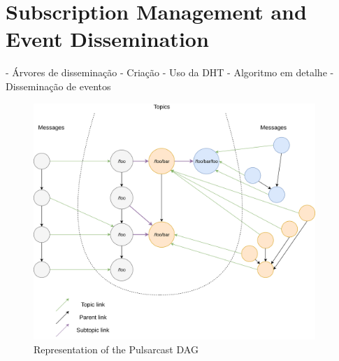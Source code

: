 \section{Subscription Management and Event Dissemination}
- Árvores de disseminação
  - Criação
  - Uso da DHT
  - Algoritmo em detalhe
- Disseminação de eventos


\begin{figure}[hb!]
  \centering
  \includegraphics[width=0.95\textwidth]{img/pulsarcast-dag.png}
  \caption{Representation of the Pulsarcast DAG}
  \label{fig:pulsarcast-dag}
\end{figure}

